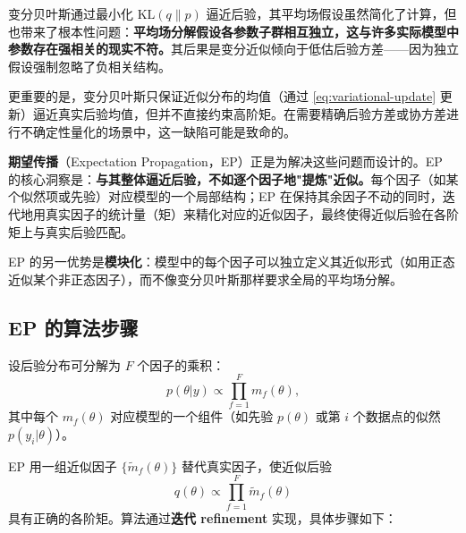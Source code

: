 变分贝叶斯通过最小化 $\text{KL}(q\|p)$ 逼近后验，其平均场假设虽然简化了计算，但也带来了根本性问题：\textbf{平均场分解假设各参数子群相互独立，这与许多实际模型中参数存在强相关的现实不符。}其后果是变分近似倾向于低估后验方差——因为独立假设强制忽略了负相关结构。

更重要的是，变分贝叶斯只保证近似分布的均值（通过 \cref{eq:variational-update} 更新）逼近真实后验均值，但并不直接约束高阶矩。在需要精确后验方差或协方差进行不确定性量化的场景中，这一缺陷可能是致命的。

\textbf{期望传播}（Expectation Propagation，EP）正是为解决这些问题而设计的。EP 的核心洞察是：\textbf{与其整体逼近后验，不如逐个因子地"提炼"近似。}每个因子（如某个似然项或先验）对应模型的一个局部结构；EP 在保持其余因子不动的同时，迭代地用真实因子的统计量（矩）来精化对应的近似因子，最终使得近似后验在各阶矩上与真实后验匹配。

EP 的另一优势是\textbf{模块化}：模型中的每个因子可以独立定义其近似形式（如用正态近似某个非正态因子），而不像变分贝叶斯那样要求全局的平均场分解。

\subsection{EP 的算法步骤}\label{sec:ep-algorithm}

设后验分布可分解为 $F$ 个因子的乘积：
\[
p(\theta|y) \propto \prod_{f=1}^F m_f(\theta),
\]
其中每个 $m_f(\theta)$ 对应模型的一个组件（如先验 $p(\theta)$ 或第 $i$ 个数据点的似然 $p(y_i|\theta)$）。

EP 用一组近似因子 $\{\tilde{m}_f(\theta)\}$ 替代真实因子，使近似后验
\[
q(\theta) \propto \prod_{f=1}^F \tilde{m}_f(\theta)
\]
具有正确的各阶矩。算法通过\textbf{迭代 refinement} 实现，具体步骤如下：

